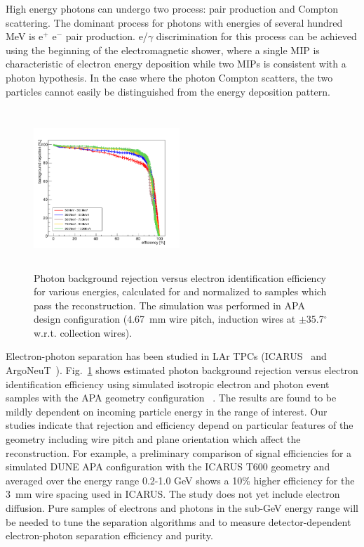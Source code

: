 High energy photons can undergo two process: pair production and Compton scattering. 
The dominant process for photons with energies of several hundred MeV is 
e$^+$ e$^-$ pair production.
e/$\gamma$ discrimination
for this process can be achieved using the beginning of the electromagnetic shower, where 
a single MIP is characteristic of electron energy deposition while two MIPs is consistent 
with a photon hypothesis.
In the case where the photon Compton scatters, the two particles cannot easily be distinguished
from the energy deposition pattern.


\begin{figure}[h!]
  \centering
\includegraphics[width=0.49\textwidth,height=6.0cm]{figures/eff-bgdrej-diffen}
  \caption{
 Photon background rejection versus electron identification efficiency for various energies, calculated for and normalized to samples which pass the reconstruction. 
The simulation was performed in APA design configuration (4.67~mm wire pitch, induction wires at $\pm$35.7$^{\circ}$ w.r.t. collection wires). 
}
\label{fig:egam}
\end{figure}
Electron-photon separation has been studied in LAr TPCs
(ICARUS~\cite{icarus_eg} and ArgoNeuT~\cite{argoneut_eg}).
Fig.~\ref{fig:egam} 
 shows estimated photon background rejection versus electron identification efficiency using 
simulated isotropic electron and photon event samples  with the 
APA geometry configuration ~\cite{dunecdr}.
The results are found to be mildly dependent
on incoming particle energy in the range of interest. 
%
Our studies indicate that rejection and efficiency depend 
on particular features of the geometry including wire pitch and plane 
orientation which affect the reconstruction. 
For example, a preliminary comparison of signal efficiencies for a simulated 
DUNE APA configuration with the ICARUS T600 geometry
and averaged over the energy range 0.2-1.0 GeV shows 
a 10\% higher efficiency for the 3~mm wire spacing used in ICARUS.
The study does not yet include electron diffusion.
%
Pure samples of electrons and photons in the sub-GeV energy range will be
needed to tune the separation algorithms and to measure 
detector-dependent electron-photon separation efficiency and purity.

